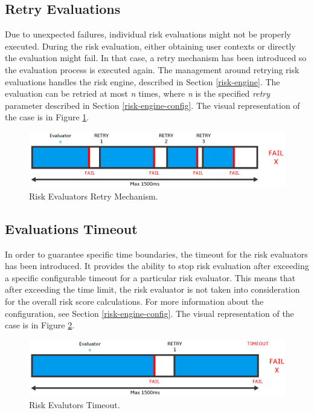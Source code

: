 \newpage

\subsection{Retry Evaluations} \label{impl-engine-retry}
Due to unexpected failures, individual risk evaluations might not be properly executed.
During the risk evaluation, either obtaining user contexts or directly the evaluation might fail.
In that case, a retry mechanism has been introduced so the evaluation process is executed again.
The management around retrying risk evaluations handles the risk engine, described in Section \ref{risk-engine}.
The evaluation can be retried at most \textit{n} times, where \textit{n} is the specified \textit{retry} parameter described in Section \ref{risk-engine-config}.
The visual representation of the case is in Figure \ref{fig:impl-risk-engine-retry}.

\begin{figure}[htbp]
  \centering
  \includegraphics[width=1\textwidth]{img/sections/6-implementation/async-retry.png}
  \caption{Risk Evaluators Retry Mechanism.}
  \label{fig:impl-risk-engine-retry}
\end{figure}

\newpage

\subsection{Evaluations Timeout} \label{impl-engine-timeout}
In order to guarantee specific time boundaries, the timeout for the risk evaluators has been introduced.
It provides the ability to stop risk evaluation after exceeding a specific configurable timeout for a particular risk evaluator.
This means that after exceeding the time limit, the risk evaluator is not taken into consideration for the overall risk score calculations.
For more information about the configuration, see Section \ref{risk-engine-config}.
The visual representation of the case is in Figure \ref{fig:impl-risk-engine-timeout}.

\begin{figure}[htbp]
  \centering
  \includegraphics[width=1\textwidth]{img/sections/6-implementation/async-timeout.png}
  \caption{Risk Evalutors Timeout.}
  \label{fig:impl-risk-engine-timeout}
\end{figure}

